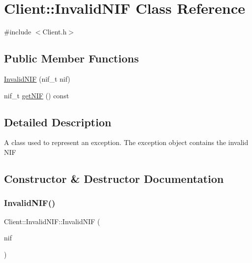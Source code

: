 \hypertarget{class_client_1_1_invalid_n_i_f}{}\section{Client\+:\+:Invalid\+N\+IF Class Reference}
\label{class_client_1_1_invalid_n_i_f}


{\ttfamily \#include $<$Client.\+h$>$}

\subsection*{Public Member Functions}
\begin{DoxyCompactItemize}
\item 
\hyperlink{class_client_1_1_invalid_n_i_f_adf33d79fc972ac7166b3419b2d5ec3a4}{Invalid\+N\+IF} (nif\+\_\+t nif)
\item 
nif\+\_\+t \hyperlink{class_client_1_1_invalid_n_i_f_a9ce8fd030fcd6ea099d40e3c53495684}{get\+N\+IF} () const
\end{DoxyCompactItemize}


\subsection{Detailed Description}
A class used to represent an exception. The exception object contains the invalid N\+IF 

\subsection{Constructor \& Destructor Documentation}
\hypertarget{class_client_1_1_invalid_n_i_f_adf33d79fc972ac7166b3419b2d5ec3a4}{}\label{class_client_1_1_invalid_n_i_f_adf33d79fc972ac7166b3419b2d5ec3a4} 
\subsubsection{\texorpdfstring{Invalid\+N\+I\+F()}{InvalidNIF()}}
{\footnotesize\ttfamily Client\+::\+Invalid\+N\+I\+F\+::\+Invalid\+N\+IF (\begin{DoxyParamCaption}\item[{nif\+\_\+t}]{nif }\end{DoxyParamCaption})\hspace{0.3cm}{\ttfamily [inline]}}

